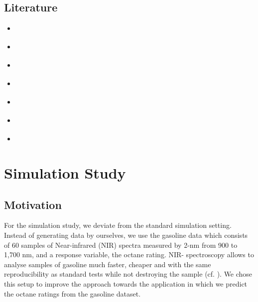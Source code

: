 \documentclass[11pt,twoside,a4paper]{article}
\begin{document}
	\subsection{Literature}
	\begin{itemize}
		\item \cite{alexanderian_KLexpansion_2015}
		\item \cite{kokoszka_introduction_2017}
		\item \cite{hsing_theoretical_2015}
		\item \cite{ramsay_functional_2005}
		\item \cite{horvath_inference_2012}
		\item \cite{cai_prediction_2006}
		\item \cite{levitin_introduction_2007}
	\end{itemize}
	
	\newpage
	\section{Simulation Study}
	

	\subsection{Motivation}
	For the simulation study, we deviate from the standard simulation setting. Instead of generating data by ourselves, we use the gasoline data which consists of 60 samples of Near-infrared (NIR) spectra measured by 2-nm from 900 to 1,700 nm, and a response variable,  the octane rating. NIR- spectroscopy allows to analyse samples of gasoline much faster, cheaper and with the same reproducibility as standard tests while not destroying the sample (cf. \cite{Bohacs_Ovadi_Salgo1998}). We chose this setup to improve the approach towards the application in which we  predict the octane ratings from the gasoline dataset.
	
\end{document}

